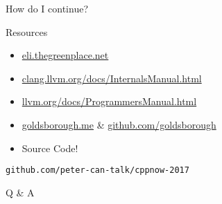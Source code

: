 
\begin{slide}{}
  \fontsize{32}{32}\selectfont
  \color{llvmblue}
  How do I continue?
\end{slide}

\begin{slide}{Resources}
  \begin{itemize}
      \item \url{eli.thegreenplace.net}
      \item \url{clang.llvm.org/docs/InternalsManual.html}
      \item \url{llvm.org/docs/ProgrammersManual.html}
      \item \url{goldsborough.me} \& \url{github.com/goldsborough}
      \item Source Code!
  \end{itemize}
  \pause
  \vspace{0.75cm}
  \texttt{github.com/peter-can-talk/cppnow-2017}
\end{slide}

\begin{slide}{}
  \vspace{0.5cm}
  \fontsize{48}{48}\selectfont
  \color{llvmblue}
  Q \& A
\end{slide}
